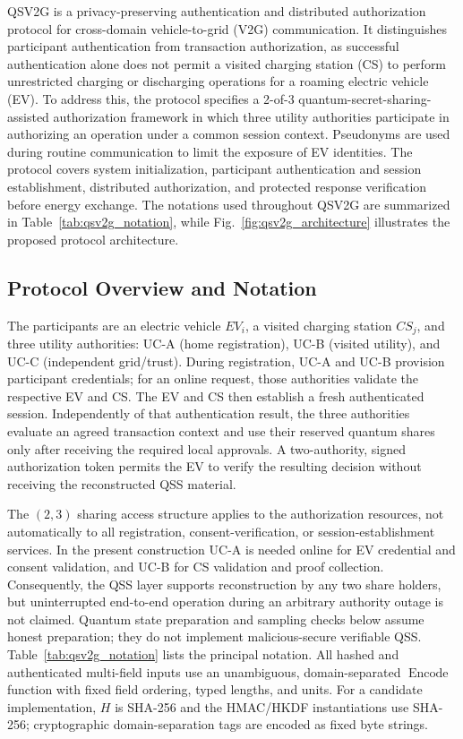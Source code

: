 \documentclass[twocolumn,10pt,journal]{IEEEtran}
\begin{document}
QSV2G is a privacy-preserving authentication and distributed
authorization protocol for cross-domain vehicle-to-grid (V2G)
communication. It distinguishes participant authentication
from transaction authorization, as successful authentication
alone does not permit a visited charging station (CS) to
perform unrestricted charging or discharging operations
for a roaming electric vehicle (EV). To address this,
the protocol specifies a 2-of-3 quantum-secret-sharing-assisted
authorization framework in which three utility authorities
participate in authorizing an operation under a common
session context. Pseudonyms are used during routine
communication to limit the exposure of EV identities.
The protocol covers system initialization, participant
authentication and session establishment, distributed
authorization, and protected response verification before
energy exchange. The notations used throughout QSV2G are
summarized in Table~\ref{tab:qsv2g_notation}, while
Fig.~\ref{fig:qsv2g_architecture} illustrates the
proposed protocol architecture.

\subsection{Protocol Overview and Notation}
\label{subsec:qsv2g_overview}
The participants are an electric vehicle $EV_i$, a visited charging
station $CS_j$, and three utility authorities: UC-A (home registration),
UC-B (visited utility), and UC-C (independent grid/trust). During
registration, UC-A and UC-B provision participant credentials; for an
online request, those authorities validate the respective EV and CS.
The EV and CS then establish a fresh authenticated session. Independently
of that authentication result, the three authorities evaluate an agreed
transaction context and use their reserved quantum shares only after
receiving the required local approvals. A two-authority, signed
authorization token permits the EV to verify the resulting decision
without receiving the reconstructed QSS material.

The $(2,3)$ sharing access structure applies to the authorization
resources, not automatically to all registration, consent-verification,
or session-establishment services. In the present construction UC-A is
needed online for EV credential and consent validation, and UC-B for CS
validation and proof collection. Consequently, the QSS layer supports
reconstruction by any two share holders, but uninterrupted end-to-end
operation during an arbitrary authority outage is not claimed. Quantum
state preparation and sampling checks below assume honest preparation;
they do not implement malicious-secure verifiable QSS. Table~\ref{tab:qsv2g_notation}
lists the principal notation. All hashed and authenticated multi-field
inputs use an unambiguous, domain-separated $\operatorname{Encode}$
function with fixed field ordering, typed lengths, and units.
For a candidate implementation, $H$ is SHA-256 and the HMAC/HKDF
instantiations use SHA-256; cryptographic domain-separation tags
are encoded as fixed byte strings.
\end{document}
